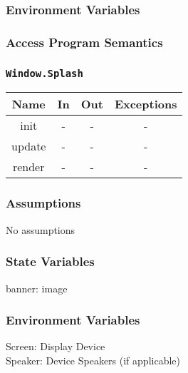 \documentclass[11pt, oneside]{article}   	%
\begin{document}
\subsubsection*{Environment Variables}




\subsubsection*{Access Program Semantics} 


\subsubsection*{\texttt{Window.Splash}}



\begin{center}
\begin{tabular}{ |c|c|c|c| } 
 \hline
 Name & In & Out & Exceptions \\ 
 \hline \hline
 init & - & - & - \\ 
 update & - & - & - \\ 
 render & - & - & - \\ 

 \hline
\end{tabular}
\end{center}

\subsubsection*{Assumptions}
No assumptions

\subsubsection*{State Variables}
banner: image\\



\subsubsection*{Environment Variables}
Screen: Display Device\\
Speaker: Device Speakers (if applicable)\\
\end{document}
